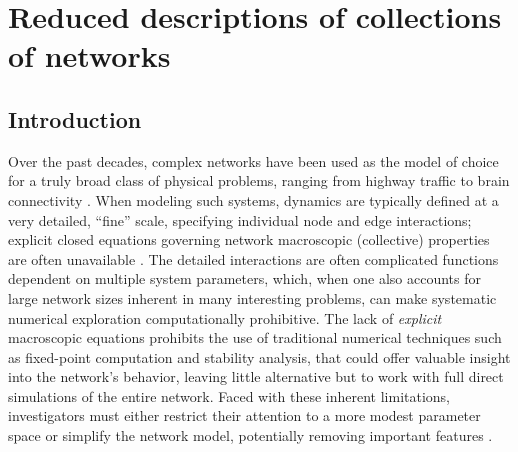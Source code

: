 \chapter{Reduced descriptions of collections of
  networks \label{ch:graphs}}



\section{Introduction\label{sec:intro}}
  

Over the past decades, complex networks have been used as the model of
choice for a truly broad class of physical problems, ranging from
highway traffic \cite{joubert_large-scale_2010} to brain connectivity
\cite{hermundstad_learning_2011}.
%
When modeling such systems, dynamics are typically defined at a very
detailed, ``fine'' scale, specifying individual node and edge
interactions; explicit closed equations governing network macroscopic
(collective) properties are often unavailable
\cite{durrett_graph_2012,joubert_large-scale_2010,roche_agent-based_2011,swaminathan_modeling_1998}.
%
The detailed interactions are often complicated functions dependent on
multiple system parameters, which, when one also accounts for large
network sizes inherent in many interesting problems, can make
systematic numerical exploration computationally prohibitive.
%
The lack of \textit{explicit} macroscopic equations prohibits the use
of traditional numerical techniques such as fixed-point computation
and stability analysis, that could offer valuable insight into the
network's behavior, leaving little alternative but to work with full
direct simulations of the entire network.
%
Faced with these inherent limitations, investigators must either
restrict their attention to a more modest parameter space
\cite{hodgkin_quantitative_1952} or simplify the network model,
potentially removing important features
\cite{brown_variability_1999}. \par

